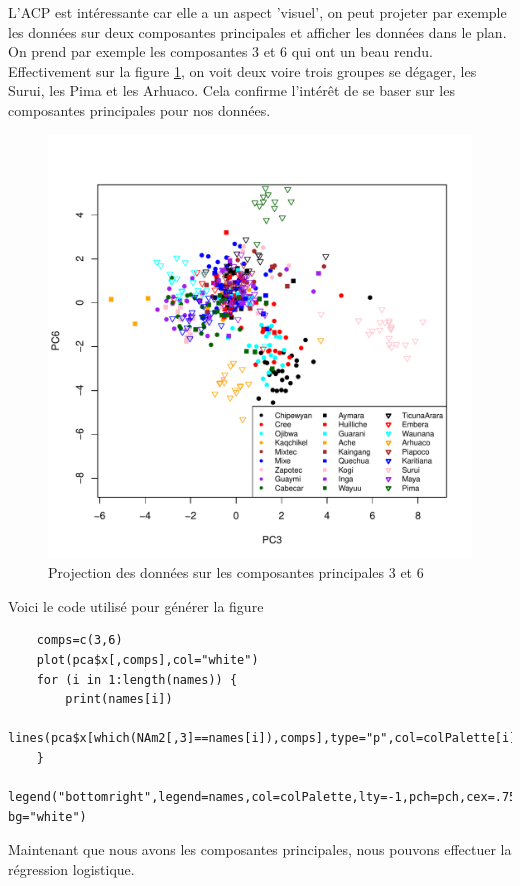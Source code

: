 \documentclass[12pt,a4paper]{article}
\begin{document}
L'ACP est intéressante car elle a un aspect 'visuel', on peut projeter par
exemple les données sur deux composantes principales et afficher les données
dans le plan. On prend par exemple les composantes 3 et 6 qui ont un beau
rendu. Effectivement sur la figure \ref{fig:acp_pc36}, on voit deux voire trois
groupes se dégager, les Surui, les Pima et les Arhuaco. Cela confirme l'intérêt
de se baser sur les composantes principales pour nos données.
\begin{figure}[h!]
	\begin{center}
		\includegraphics[scale=0.7]{figures/pc36.pdf}
		\caption{Projection des données sur les composantes principales 3 et 6}
		\label{fig:acp_pc36}
	\end{center}
\end{figure}

Voici le code utilisé pour générer la figure
\begin{lstlisting}
	comps=c(3,6)
	plot(pca$x[,comps],col="white")
	for (i in 1:length(names)) {
		print(names[i])
		lines(pca$x[which(NAm2[,3]==names[i]),comps],type="p",col=colPalette[i],pch=pch[i])
	}
	legend("bottomright",legend=names,col=colPalette,lty=-1,pch=pch,cex=.75,ncol=3,lwd=2, bg="white")
\end{lstlisting}

Maintenant que nous avons les composantes principales, nous
pouvons effectuer la régression logistique.
\end{document}
